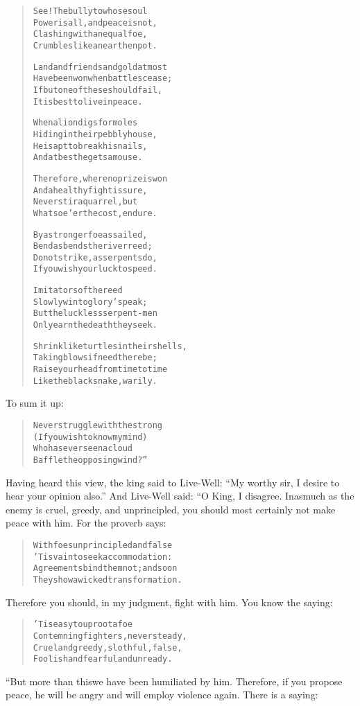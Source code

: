 \documentclass[article, twoside, 14pt]{memoir}
\renewenvironment{verbatim}{%
\begin{quote}%
\vskip -10pt%
\begin{alltt}\normalfont\large}{\end{alltt}%
\end{quote}%
\vskip -10pt
} %
\begin{document}
\begin{verbatim}
See! The bully to whose soul
    Power is all, and peace is not,
Clashing with an equal foe,
    Crumbles like an earthen pot.

Land and friends and gold at most
    Have been won when battles cease;
If but one of these should fail,
    It is best to live in peace.

When a lion digs for moles
    Hiding in their pebbly house,
He is apt to break his nails,
    And at best he gets a mouse.

Therefore, where no prize is won
    And a healthy fight is sure,
Never stir a quarrel, but
    Whatsoe'er the cost, endure.

By a stronger foe assailed,
    Bend as bends the river reed;
Do not strike, as serpents do,
    If you wish your luck to speed.

Imitators of the reed
    Slowly win to glory's peak;
But the luckless serpent-men
    Only earn the death they seek.

Shrink like turtles in their shells,
    Taking blows if need there be;
Raise your head from time to time
    Like the black snake, warily.
\end{verbatim}
To sum it up:

\begin{verbatim}
Never struggle with the strong
    (If you wish to know my mind)
Who has ever seen a cloud
    Baffle the opposing wind?”
\end{verbatim}
Having heard this view, the king said to Live-Well:
``My worthy sir, I desire to hear your opinion also.'' And
Live-Well said: “O King, I disagree. Inasmuch as the enemy is
cruel, greedy, and unprincipled, you should most certainly not make
peace with him. For the proverb says:

\begin{verbatim}
With foes unprincipled and false
    'Tis vain to seek accommodation:
Agreements bind them not; and soon
    They show a wicked transformation.
\end{verbatim}
Therefore you should, in my judgment, fight with him. You know the
saying:

\begin{verbatim}
'Tis easy to uproot a foe
    Contemning fighters, never steady,
Cruel and greedy, slothful, false,
    Foolish and fearful and unready.
\end{verbatim}
“But more than this{\textemdash}we have been humiliated by him. Therefore, if
you propose peace, he will be angry and will employ violence again.
There is a saying:
\end{document}
